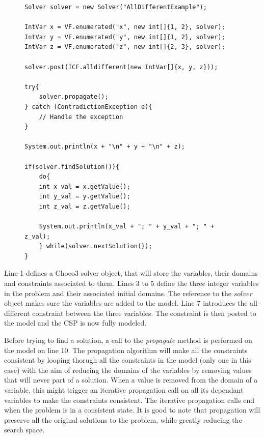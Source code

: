 \documentclass{l4proj}
\begin{document}
\begin{figure}[H]
%
\begin{lstlisting}
Solver solver = new Solver("AllDifferentExample");

IntVar x = VF.enumerated("x", new int[]{1, 2}, solver); 
IntVar y = VF.enumerated("y", new int[]{1, 2}, solver);
IntVar z = VF.enumerated("z", new int[]{2, 3}, solver);

solver.post(ICF.alldifferent(new IntVar[]{x, y, z}));

try{
    solver.propagate();
} catch (ContradictionException e){
    // Handle the exception
}

System.out.println(x + "\n" + y + "\n" + z);

if(solver.findSolution()){
    do{
	int x_val = x.getValue();
	int y_val = y.getValue();
	int z_val = z.getValue();

	System.out.println(x_val + "; " + y_val + "; " + z_val);
    } while(solver.nextSolution());
}
\end{lstlisting}
\label{choco3code}
\end{figure}
 
\noindent Line 1 defines a Choco3 solver object, that will store the variables, their domains and constraints associated to them. Lines 3 to 5 define the three integer variables in the problem and their associated initial domains. The reference to the $solver$ object makes sure the variables are added to the model. Line 7 introduces the all-different constraint between the three variables. The constraint is then posted to the model and the CSP is now fully modeled.

\noindent Before trying to find a solution, a call to the \textit{propagate} method is performed on the model on line 10. The propagation algorithm will make all the constraints consistent by looping thorugh all the constraints in the model (only one in this case) with the aim of reducing the domains of the variables by removing values that will never part of a solution. When a value is removed from the domain of a variable, this might trigger an iterative propagation call on all its dependant variables to make the constraints consistent. The iterative propagation calls end when the problem is in a consistent state. It is good to note that propagation will preserve all the original solutions to the problem, while greatly reducing the search space.
\end{document}
